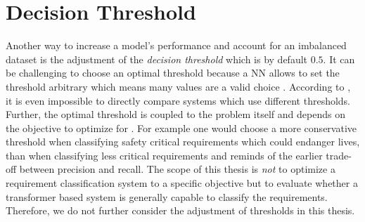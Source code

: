 \section{Decision Threshold}
\label{chp:future_work:sec:decision_threshold}
Another way to increase a model's performance and account for an imbalanced dataset is the adjustment of the \textit{decision threshold} which is by default $0.5$.
It can be challenging to choose an optimal threshold because a \ac{NN} allows to set the threshold arbitrary which means many values are a valid choice \parencite{Mazurowski:2008}.
According to \textcite{Mazurowski:2008}, it is even impossible to directly compare systems which use different thresholds.
Further, the optimal threshold is coupled to the problem itself and depends on the objective to optimize for \parencite{Brown:2019}.
For example one would choose a more conservative threshold when classifying safety critical requirements which could endanger lives, than when classifying less critical requirements and reminds of the earlier trade-off between precision and recall.
The scope of this thesis is \textit{not} to optimize a requirement classification system to a specific objective but to evaluate whether a transformer based system is generally capable to classify the requirements.
Therefore, we do not further consider the adjustment of thresholds in this thesis.
